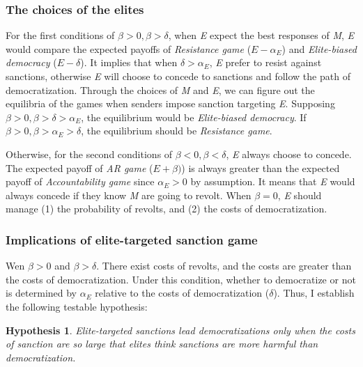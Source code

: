 \documentclass[11pt]{article}
\newtheorem{hyp}{Hypothesis}
\begin{document}
	\subsubsection*{The choices of the elites}
	
	For the first conditions of $\beta > 0, \beta > \delta$, when \textit{E} expect the best responses of \textit{M}, \textit{E} would compare the expected payoffs of \textit{Resistance game} ($E-\alpha_{E}$) and \textit{Elite-biased democracy} ($E-\delta$). It implies that when $\delta > \alpha_{E}$, \textit{E} prefer to resist against sanctions, otherwise \textit{E} will choose to concede to sanctions and follow the path of democratization. Through the choices of \textit{M} and \textit{E}, we can figure out the equilibria of the games when senders impose sanction targeting \textit{E}. Supposing $\beta > 0, \beta > \delta > \alpha_{E}$, the equilibrium would be \textit{Elite-biased democracy}. If $\beta > 0, \beta > \alpha_{E} > \delta$, the equilibrium should be \textit{Resistance game}.
	
	Otherwise, for the second conditions of $\beta <0, \beta < \delta$, \textit{E} always choose to concede. The expected payoff of \textit{AR game} ($E+\beta)$) is always greater than the expected payoff of \textit{Accountability game} since $\alpha_{E} > 0$ by assumption. It means that \textit{E} would always concede if they know \textit{M} are going to revolt. When $\beta = 0$, \textit{E} should manage (1) the probability of revolts, and (2) the costs of democratization.
	
	\subsubsection*{Implications of elite-targeted sanction game}
	
	Wen $\beta > 0$ and $\beta > \delta$. There exist costs of revolts, and the costs are greater than the costs of democratization. Under this condition, whether to democratize or not is determined by $\alpha_{E}$ relative to the costs of democratization ($\delta$). Thus, I establish the following testable hypothesis:
	
	\begin{hyp}
		Elite-targeted sanctions lead democratizations only when the costs of sanction are so large that elites think sanctions are more harmful than democratization.
	\end{hyp}
	
	
	
\end{document}
